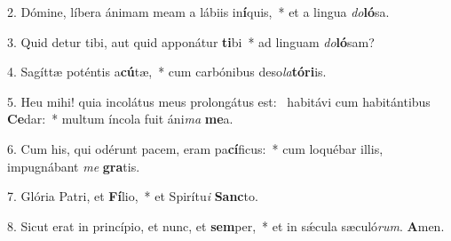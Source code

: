 2. Dómine, líbera ánimam meam a lábiis in\textbf{í}quis,~*  et a lingua \textit{do}\textbf{ló}sa.\

3. Quid detur tibi, aut quid apponátur \textbf{ti}bi~*  ad linguam \textit{do}\textbf{ló}sam?\

4. Sagíttæ poténtis a\textbf{cú}tæ,~*  cum carbónibus deso\textit{la}\textbf{tó}\textbf{ri}is.\

5. Heu mihi! quia incolátus meus prolongátus est: \dag\  habitávi cum habitántibus \textbf{Ce}dar:~*  multum íncola fuit áni\textit{ma} \textbf{me}a.\

6. Cum his, qui odérunt pacem, eram pa\textbf{cí}ficus:~*  cum loquébar illis, impugnábant \textit{me} \textbf{gra}tis.\

7. Glória Patri, et \textbf{Fí}lio,~*  et Spirítu\textit{i} \textbf{Sanc}to.\

8. Sicut erat in princípio, et nunc, et \textbf{sem}per,~*  et in sǽcula sæculó\textit{rum}. \textbf{A}men.\


